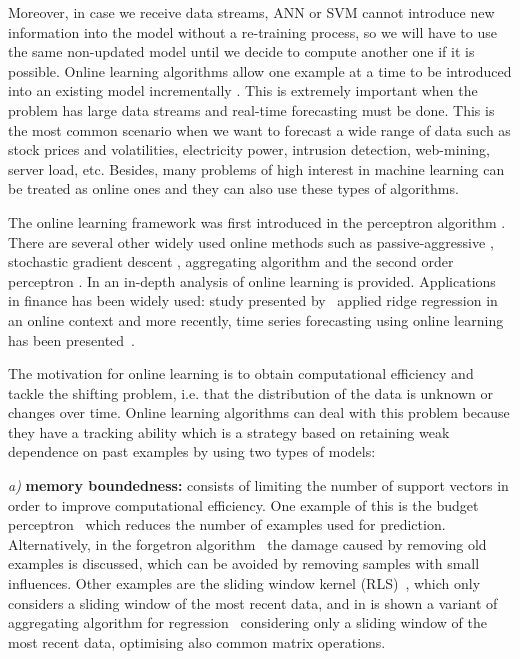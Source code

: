 Moreover, in case we receive data streams, ANN or SVM cannot introduce new
information into the model without a re-training process, so we will have to use
the same non-updated model until we decide to compute another one if it is
possible.  Online learning algorithms allow one example at a time to be
introduced into an existing model incrementally \cite{vovk2005}. This is
extremely important when the problem has large data streams and real-time
forecasting must be done.  This is the most common scenario when we want to
forecast a wide range of data such as stock prices and volatilities, electricity
power, intrusion detection, web-mining, server load, etc.  Besides, many
problems of high interest in machine learning can be treated as online ones and
they can also use these types of algorithms.

The online learning framework was first introduced in the perceptron algorithm
\cite{rosenblatt58}. There are several other widely used online methods such as
passive-aggressive \cite{crammerETall2006}, stochastic gradient descent
\cite{zhang2004}, aggregating algorithm \cite{vovk2001} and the second order
perceptron \cite{cesa-bianchi2005}.  In \cite{cesa-bianchi2006} an in-depth
analysis of online learning is provided. Applications in finance has been widely used: study presented by~\cite{arce+salinas2012} applied ridge regression in an online context and more recently, time series forecasting using online learning has been presented~\cite{anavaetAl2013}.

The motivation for online learning is to obtain computational efficiency and
tackle the shifting problem, i.e. that the distribution of the data is unknown
or changes over time. Online learning algorithms can deal with this problem
because they have a tracking ability which is a strategy based on retaining weak
dependence on past examples by using two types of models: 

\textit{a)} \textbf{memory boundedness:} consists of limiting the number of
support vectors in order to improve computational efficiency. One example of
this is the budget perceptron~\cite{crammeretal2004} which reduces the number of
examples used for prediction. Alternatively, in the forgetron
algorithm~\cite{dekeletal2008} the damage caused by removing old examples is
discussed, which can be avoided by removing samples with small influences. Other
examples are the sliding window kernel (RLS)~\cite{vanvaerenberghetal2006},
which only considers a sliding window of the most recent data, and in
\cite{arce+salinas2012} is shown a variant of aggregating algorithm for
regression~\cite{vovk2001} considering only a sliding window of the most recent
data, optimising also common matrix operations.

